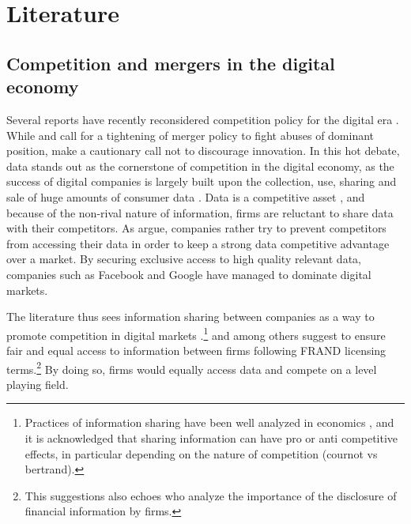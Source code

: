 \documentclass[a4paper,leqno]{article}%
\begin{document}
\section{Literature}


\subsection{Competition and mergers in the digital economy}


Several reports have recently reconsidered competition policy for the digital era \citep{federico2019antitrust}. While \cite{scott2019committee} and \cite{shapiro2019protecting} call for a tightening of merger policy to fight abuses of dominant position, \cite{cabral2021merger} make a cautionary call not to discourage innovation. In this hot debate, data stands out as the cornerstone of competition in the digital economy, as the success of digital companies is largely built upon the collection, use, sharing and sale of huge amounts of consumer data \citep{varian1989price, bergemann2015selling}. Data is a competitive asset \citep{hagiu2020data}, and because of the non-rival nature of information, firms are reluctant to share data with their competitors. As \cite{jones2020nonrivalry} argue, companies rather try to prevent competitors from accessing their data in order to keep a strong data competitive advantage over a market. By securing exclusive access to high quality relevant data, companies such as Facebook and Google have managed to dominate digital markets. 

The literature thus sees information sharing between companies as a way to promote competition in digital markets \citep{martens2020business}.\footnote{Practices of information sharing have been well analyzed in economics \citep{vives1984duopoly, gal1986information}, and it is acknowledged that sharing information can have pro or anti competitive effects, in particular depending on the nature of competition (cournot vs bertrand).} \cite{tirole2020competition} and \cite{cremer2019competition} among others suggest to ensure fair and equal access to information between firms following FRAND licensing terms.\footnote{This suggestions also echoes \cite{admati2000forcing} who analyze the importance of the disclosure of financial information by firms.} By doing so, firms would equally access data and compete on a level playing field. 
\end{document}
